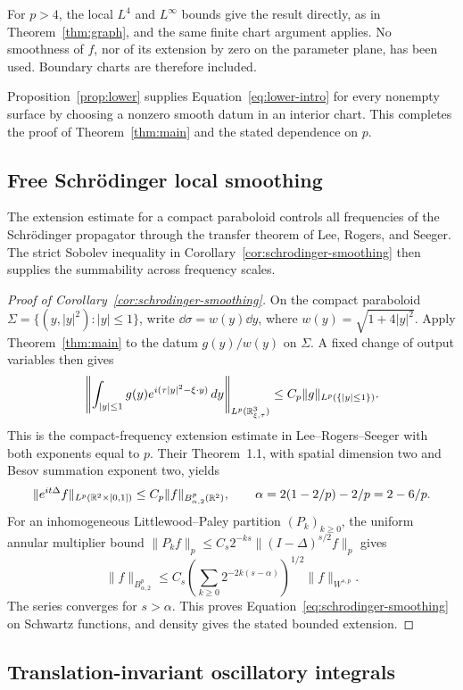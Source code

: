 For \(p>4\), the local \(L^4\) and \(L^\infty\) bounds give the result
directly, as in Theorem~\ref{thm:graph}, and the same finite chart
argument applies. No smoothness of \(f\), nor of its extension by
zero on the parameter plane, has been used. Boundary charts are
therefore included.

Proposition~\ref{prop:lower} supplies
Equation~\eqref{eq:lower-intro} for every nonempty surface by choosing
a nonzero smooth datum in an interior chart. This completes the
proof of Theorem~\ref{thm:main} and the stated dependence on \(p\).

\subsection{Free Schr\"odinger local smoothing}

The extension estimate for a compact paraboloid controls all frequencies
of the Schr\"odinger propagator through the transfer theorem of
Lee, Rogers, and Seeger. The strict Sobolev inequality in
Corollary~\ref{cor:schrodinger-smoothing} then supplies the summability
across frequency scales.

\begin{proof}[Proof of Corollary~\ref{cor:schrodinger-smoothing}]
On the compact paraboloid
\(\Sigma=\{(y,|y|^2):|y|\le1\}\), write
\(\dd\sigma=w(y)\dd y\), where \(w(y)=\sqrt{1+4|y|^2}\).
Apply Theorem~\ref{thm:main} to the datum \(g(y)/w(y)\) on \(\Sigma\).
A fixed change of output variables then gives
\[
 \left\|\int_{|y|\le1}g(y)e^{i(\tau|y|^2-\xi\cdot y)}\,d y\right\|_{L^p(\mathbb R^3_{\xi,\tau})}
 \le C_p\|g\|_{L^p(\{|y|\le1\})}.
\]
This is the compact-frequency extension estimate in
Lee--Rogers--Seeger \cite[Equation~(1.3)]{LeeRogersSeeger2013} with
both exponents equal to \(p\). Their Theorem~1.1, with spatial dimension
two and Besov summation exponent two, yields
\[
 \|e^{it\Delta}f\|_{L^p(\mathbb R^2\times[0,1])}
 \le C_p\|f\|_{B^p_{\alpha,2}(\mathbb R^2)},
 \qquad \alpha=2(1-2/p)-2/p=2-6/p.
\]
For an inhomogeneous Littlewood--Paley partition \((P_k)_{k\ge0}\),
the uniform annular multiplier bound
\(\|P_kf\|_p\le C_s2^{-ks}\|(I-\Delta)^{s/2}f\|_p\) gives
\[
 \|f\|_{B^p_{\alpha,2}}
 \le C_s\left(\sum_{k\ge0}2^{-2k(s-\alpha)}\right)^{1/2}
       \|f\|_{W^{s,p}}.
\]
The series converges for \(s>\alpha\). This proves
Equation~\eqref{eq:schrodinger-smoothing} on Schwartz functions, and
density gives the stated bounded extension.
\end{proof}

\subsection{Translation-invariant oscillatory integrals}

